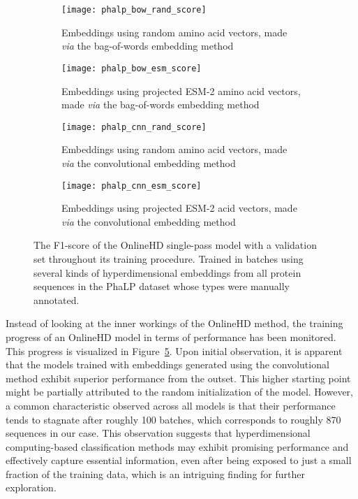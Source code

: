 \begin{figure}[h!]
    \centering
    \begin{subfigure}{0.48\textwidth}
        \texttt{[image: phalp\_bow\_rand\_score]}
        \caption{Embeddings using random amino acid vectors, made \textit{via} the bag-of-words embedding method}
        \label{fig:subfig-a3}
    \end{subfigure}
    \hfill
    \begin{subfigure}{0.48\textwidth}
        \texttt{[image: phalp\_bow\_esm\_score]}
        \caption{Embeddings using projected ESM-2 amino acid vectors, made \textit{via} the bag-of-words embedding method}
        \label{fig:subfig-b3}
    \end{subfigure}
    
    \begin{subfigure}{0.48\textwidth}
        \texttt{[image: phalp\_cnn\_rand\_score]}
        \caption{Embeddings using random amino acid vectors, made \textit{via} the convolutional embedding method}
        \label{fig:subfig-c3}
    \end{subfigure}
    \hfill
    \begin{subfigure}{0.48\textwidth}
        \texttt{[image: phalp\_cnn\_esm\_score]}
        \caption{Embeddings using projected ESM-2 acid vectors, made \textit{via} the convolutional embedding method}
        \label{fig:subfig-d3}
    \end{subfigure}
    \caption{The F1-score of the OnlineHD single-pass model with a validation set throughout its training procedure. Trained in batches using several kinds of hyperdimensional embeddings from all protein sequences in the PhaLP dataset whose types were manually annotated.}
    \label{fig:main39}
\end{figure}

Instead of looking at the inner workings of the OnlineHD method, the training progress of an OnlineHD model in terms of performance has been monitored. This progress is visualized in Figure~\ref{fig:main39}. Upon initial observation, it is apparent that the models trained with embeddings generated using the convolutional method exhibit superior performance from the outset. This higher starting point might be partially attributed to the random initialization of the model. However, a common characteristic observed across all models is that their performance tends to stagnate after roughly 100 batches, which corresponds to roughly 870 sequences in our case. This observation suggests that hyperdimensional computing-based classification methods may exhibit promising performance and effectively capture essential information, even after being exposed to just a small fraction of the training data, which is an intriguing finding for further exploration.


